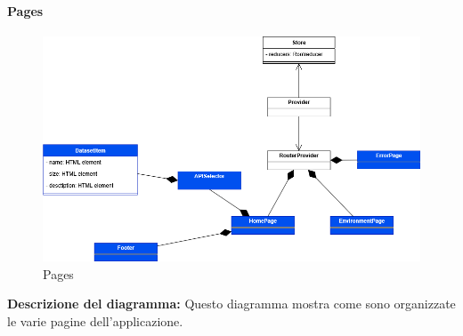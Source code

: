 \paragraph{Pages}
\begin{figure}[h!] \centering
    \includegraphics[scale=0.45]{template/images/uml_front/ui/pages.png}
    \caption{Pages}
\end{figure}
\textbf{Descrizione del diagramma:}
Questo diagramma mostra come sono organizzate le varie pagine dell'applicazione.
